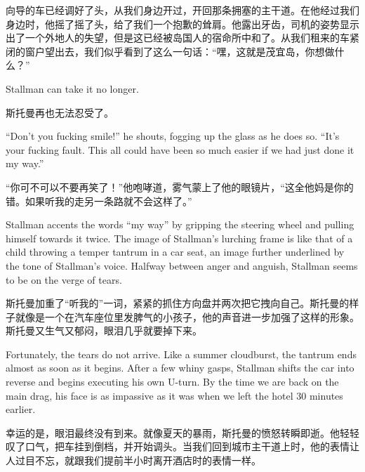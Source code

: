\ifdefined\chs
向导的车已经调好了头，从我们身边开过，开回那条拥塞的主干道。在他经过我们身边时，他摇了摇了头，给了我们一个抱歉的耸肩。他露出牙齿，司机的姿势显示出了一个外地人的失望，但是这已经被岛国人的宿命所中和了。从我们租来的车紧闭的窗户望出去，我们似乎看到了这么一句话：``嘿，这就是茂宜岛，你想做什么？''
\fi

\ifdefined\eng
Stallman can take it no longer.
\fi

\ifdefined\chs
斯托曼再也无法忍受了。
\fi

\ifdefined\eng
``Don't you fucking smile!'' he shouts, fogging up the glass as he does so. ``It's your fucking fault. This all could have been so much easier if we had just done it my way.'' %
\fi

\ifdefined\chs
``你可不可以不要再笑了！''他咆哮道，雾气蒙上了他的眼镜片，``这全他妈是你的错。如果听我的走另一条路就不会这样了。''%
\fi

\ifdefined\eng
Stallman accents the words ``my way'' by gripping the steering wheel and pulling himself towards it twice. The image of Stallman's lurching frame is like that of a child throwing a temper tantrum in a car seat, an image further underlined by the tone of Stallman's voice. Halfway between anger and anguish, Stallman seems to be on the verge of tears.
\fi

\ifdefined\chs
斯托曼加重了``听我的''一词，紧紧的抓住方向盘并两次把它拽向自己。斯托曼的样子就像是一个在汽车座位里发脾气的小孩子，他的声音进一步加强了这样的形象。斯托曼又生气又郁闷，眼泪几乎就要掉下来。
\fi

\ifdefined\eng
Fortunately, the tears do not arrive. Like a summer cloudburst, the tantrum ends almost as soon as it begins. After a few whiny gasps, Stallman shifts the car into reverse and begins executing his own U-turn. By the time we are back on the main drag, his face is as impassive as it was when we left the hotel 30 minutes earlier.
\fi

\ifdefined\chs
幸运的是，眼泪最终没有到来。就像夏天的暴雨，斯托曼的愤怒转瞬即逝。他轻轻叹了口气，把车挂到倒档，并开始调头。当我们回到城市主干道上时，他的表情让人过目不忘，就跟我们提前半小时离开酒店时的表情一样。
\fi

